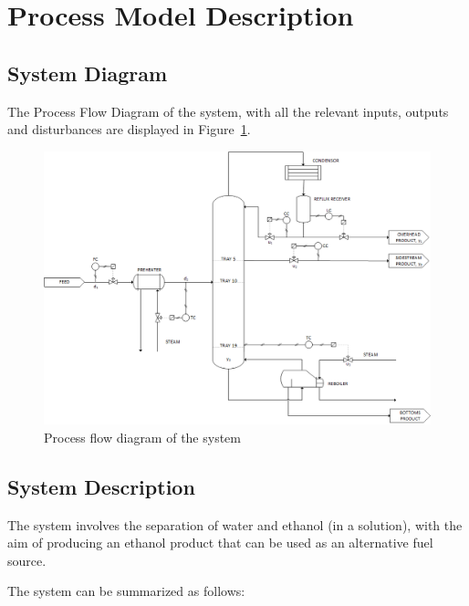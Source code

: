 \section{Process Model Description}

\subsection{System Diagram}

The Process Flow Diagram of the system, with all the relevant inputs, outputs and disturbances are displayed in Figure~\ref{fig:PFD}.

\begin{figure}[tbph]
	\centering
	\includegraphics[width=0.9\linewidth]{Figures/Process_PFD}
	\caption{Process flow diagram of the system}
	\label{fig:PFD}
\end{figure}


\subsection{System Description}

The system involves the separation of water and ethanol (in a solution), with the aim of producing an ethanol product that can be used as an alternative fuel source.

The system can be summarized as follows:

